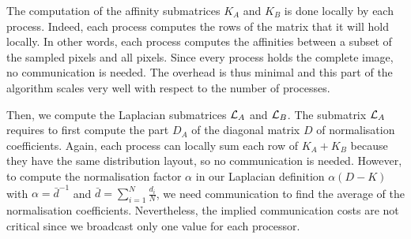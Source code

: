 The computation of the affinity submatrices \(K_A\) and \(K_B\) is done locally by each process.
Indeed, each process computes the rows of the matrix that it will hold locally.
In other words, each process computes the affinities between a subset of the sampled pixels and all pixels.
Since every process holds the complete image, no communication is needed.
The overhead is thus minimal and this part of the algorithm scales very well with respect to the number of processes.

Then, we compute the Laplacian submatrices \(\operatorname{\mathcal{L}}_A\) and \(\operatorname{\mathcal{L}}_B\).
The submatrix \(\operatorname{\mathcal{L}}_A\) requires to first compute the part \(D_A\) of the diagonal matrix \(D\) of normalisation coefficients.
Again, each process can locally sum each row of \(K_A + K_B\) because they have the same distribution layout, so no communication is needed.
However, to compute the normalisation factor \(\alpha\) in our Laplacian definition \(\alpha (D - K)\) with \(\alpha = \bar{d}^{-1}\) and \(\bar{d} = \sum^N_{i=1} \frac{d_i}{N}\), we need communication to find the average of the normalisation coefficients.
Nevertheless, the implied communication costs are not critical since we broadcast only one value for each processor.
